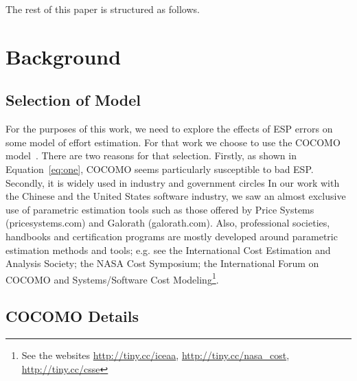 \documentclass[final,twocolumn,5p]{elsarticle}
\newcommand{\eq}[1]{Equation~\ref{eq:#1}}
\theoremstyle{break}
\begin{document}
  
  
  The rest of this paper is structured as follows.
  
  \section{Background}
  



\subsection{Selection of Model}

For the purposes of this work, we need to explore the effects of ESP errors on some model
of effort estimation. For that work we choose to use the COCOMO model~\cite{boehm81,boehm00b}.
There are two reasons for that selection. Firstly, as shown in \eq{one}, COCOMO seems particularly
susceptible to bad ESP. Secondly, it is widely used in industry and government circles
In our work with the Chinese and the United States software industry,
we saw an   almost exclusive
use  of parametric estimation tools such as those offered by 
Price Systems (pricesystems.com) and  Galorath (galorath.com).
Also,
professional societies, handbooks and
certification programs are mostly developed around 
parametric estimation methods and tools; e.g. see the 
International Cost Estimation and Analysis Society; the
NASA Cost Symposium;  the
International Forum on COCOMO and Systems/Software
Cost Modeling\footnote{See the websites \url{http://tiny.cc/iceaa}, \url{http://tiny.cc/nasa_cost}, \url{http://tiny.cc/csse}}.

  \subsection{COCOMO Details}
\end{document}
